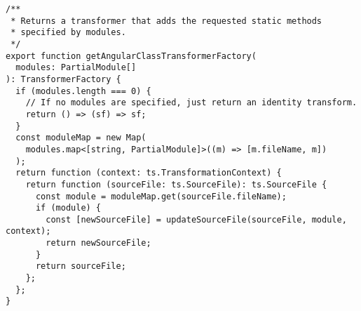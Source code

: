\begin{verbatim}
/**
 * Returns a transformer that adds the requested static methods
 * specified by modules.
 */
export function getAngularClassTransformerFactory(
  modules: PartialModule[]
): TransformerFactory {
  if (modules.length === 0) {
    // If no modules are specified, just return an identity transform.
    return () => (sf) => sf;
  }
  const moduleMap = new Map(
    modules.map<[string, PartialModule]>((m) => [m.fileName, m])
  );
  return function (context: ts.TransformationContext) {
    return function (sourceFile: ts.SourceFile): ts.SourceFile {
      const module = moduleMap.get(sourceFile.fileName);
      if (module) {
        const [newSourceFile] = updateSourceFile(sourceFile, module, context);
        return newSourceFile;
      }
      return sourceFile;
    };
  };
}
\end{verbatim}
